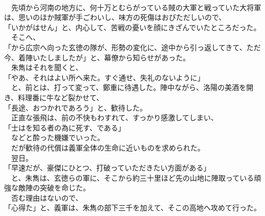 \documentclass[
  paper=a5,
  fontsize=10pt,
  jafontsize=9.5pt,
  tate,                  %
  open_bracket_pos=nibu, %
]{jlreq}
\begin{document}
\\


　先頃から河南の地方に、何十万とむらがっている賊の大軍と戦っていた大将軍は、思いのほか賊軍が手ごわいし、味方の死傷はおびただしいので、\\


「いかがはせん」と、内心して、苦戦の憂いを顔にきざんでいたところだった。\\


　そこへ、\\


「から広宗へ向った玄徳の隊が、形勢の変化に、途中から引っ返してきて、ただ今、着陣いたしましたが」と、幕僚から知らせがあった。\\


　朱雋はそれを聞くと、\\


「やあ、それはよい所へ来た。すぐ通せ、失礼のないように」\\


　と、前とは、打って変って、鄭重に待遇した。陣中ながら、洛陽の美酒を開き、料理番に牛など裂かせて、\\


「長途、おつかれであろう」と、歓待した。\\


　正直な張飛は、前の不快もわすれて、すっかり感激してしまい、\\


「士はを知る者の為に死す、である」\\


　などと酔った機嫌でいった。\\


　だが歓待の代償は義軍全体の生命に近いものを求められた。\\


　翌日。\\


「早速だが、豪傑にひとつ、打破っていただきたい方面がある」\\


　と、朱雋は、玄徳らの軍に、そこから約三十里ほど先の山地に陣取っている頑強な敵陣の突破を命じた。\\


　否む理由はないので、\\


「心得た」と、義軍は、朱雋の部下三千を加えて、そこの高地へ攻めて行った。\\
\end{document}
